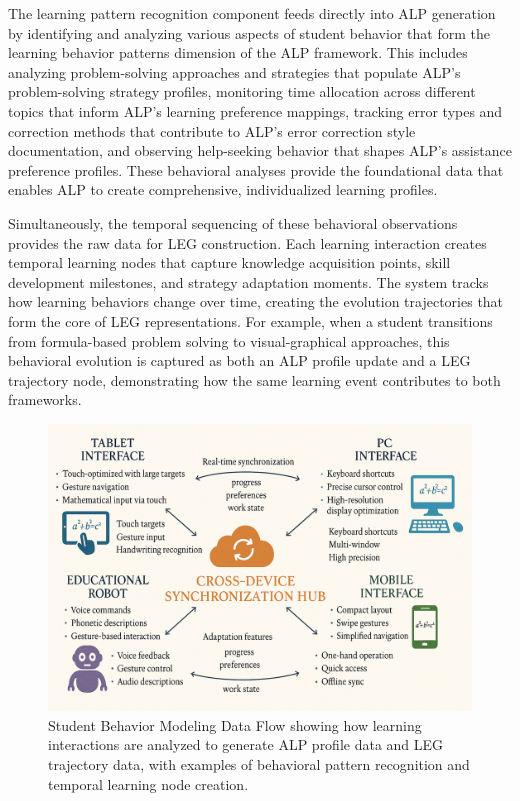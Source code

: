 \documentclass[conference]{IEEEtran}
\begin{document}
\begin{IEEEkeywords}
The learning pattern recognition component feeds directly into ALP generation by identifying and analyzing various aspects of student behavior that form the learning behavior patterns dimension of the ALP framework. This includes analyzing problem-solving approaches and strategies that populate ALP's problem-solving strategy profiles, monitoring time allocation across different topics that inform ALP's learning preference mappings, tracking error types and correction methods that contribute to ALP's error correction style documentation, and observing help-seeking behavior that shapes ALP's assistance preference profiles. These behavioral analyses provide the foundational data that enables ALP to create comprehensive, individualized learning profiles.

Simultaneously, the temporal sequencing of these behavioral observations provides the raw data for LEG construction. Each learning interaction creates temporal learning nodes that capture knowledge acquisition points, skill development milestones, and strategy adaptation moments. The system tracks how learning behaviors change over time, creating the evolution trajectories that form the core of LEG representations. For example, when a student transitions from formula-based problem solving to visual-graphical approaches, this behavioral evolution is captured as both an ALP profile update and a LEG trajectory node, demonstrating how the same learning event contributes to both frameworks.

\begin{figure}[htbp]
\centerline{\includegraphics[width=\columnwidth]{4.png}}
\caption{Student Behavior Modeling Data Flow showing how learning interactions are analyzed to generate ALP profile data and LEG trajectory data, with examples of behavioral pattern recognition and temporal learning node creation.}
\label{fig:behavior_modeling}
\end{figure}


\end{IEEEkeywords}
\end{document}
